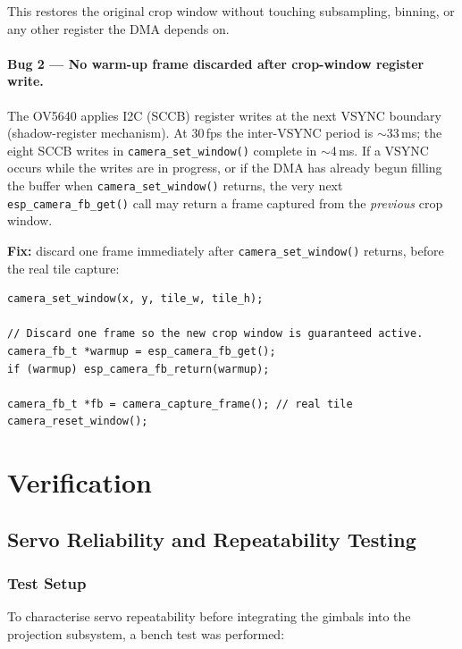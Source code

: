 \documentclass[12pt]{article}
\begin{document}
This restores the original crop window without touching subsampling,
binning, or any other register the DMA depends on.

\paragraph{Bug 2 --- No warm-up frame discarded after crop-window register write.}

The OV5640 applies I2C (SCCB) register writes at the next VSYNC boundary
(shadow-register mechanism).  At 30\,fps the inter-VSYNC period is $\sim$33\,ms;
the eight SCCB writes in \texttt{camera\_set\_window()} complete in
$\sim$4\,ms.  If a VSYNC occurs while the writes are in progress, or if the DMA
has already begun filling the buffer when \texttt{camera\_set\_window()} returns,
the very next \texttt{esp\_camera\_fb\_get()} call may return a frame captured
from the \emph{previous} crop window.

\textbf{Fix:} discard one frame immediately after \texttt{camera\_set\_window()}
returns, before the real tile capture:

\begin{verbatim}
camera_set_window(x, y, tile_w, tile_h);

// Discard one frame so the new crop window is guaranteed active.
camera_fb_t *warmup = esp_camera_fb_get();
if (warmup) esp_camera_fb_return(warmup);

camera_fb_t *fb = camera_capture_frame(); // real tile
camera_reset_window();
\end{verbatim}


\section{Verification}

\subsection{Servo Reliability and Repeatability Testing}

\subsubsection{Test Setup}

To characterise servo repeatability before integrating the gimbals into the
projection subsystem, a bench test was performed:
\end{document}

